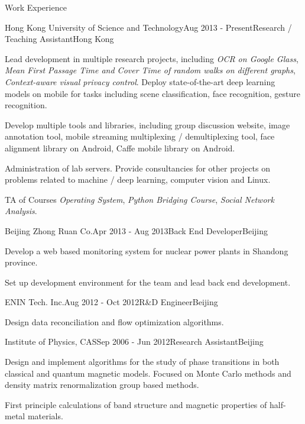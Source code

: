 \documentclass{resume} %
\begin{document}
\begin{rSection}{Work Experience}

\begin{rSubsection}{Hong Kong University of Science and Technology}{Aug 2013 - Present}{Research / Teaching Assistant}{Hong Kong}
\item Lead development in multiple research projects, including {\it OCR on Google Glass}, {\it Mean First Passage Time and Cover Time of random walks on different graphs}, {\it Context-aware visual privacy control}. Deploy state-of-the-art deep learning models on mobile for tasks including scene classification, face recognition, gesture recognition.

\item Develop multiple tools and libraries, including group discussion website, image annotation tool, mobile streaming multiplexing / demultiplexing tool, face alignment library on Android, Caffe mobile library on Android.

\item Administration of lab servers. Provide consultancies for other projects on problems related to machine / deep learning, computer vision and Linux.

\item TA of Courses {\it Operating System}, {\it Python Bridging Course}, {\it Social Network Analysis}.
\end{rSubsection}


\begin{rSubsection}{Beijing Zhong Ruan Co.}{Apr 2013 - Aug 2013}{Back End Developer}{Beijing}
\item Develop a web based monitoring system for nuclear power plants in Shandong province.
\item Set up development environment for the team and lead back end development.
\end{rSubsection}

\begin{rSubsection}{ENIN Tech. Inc.}{Aug 2012 - Oct 2012}{R\&D Engineer}{Beijing}
\item Design data reconciliation and flow optimization algorithms.
\end{rSubsection}

\begin{rSubsection}{Institute of Physics, CAS}{Sep 2006 - Jun 2012}{Research Assistant}{Beijing}
\item Design and implement algorithms for the study of phase transitions in both classical and quantum magnetic models. Focused on Monte Carlo methods and density matrix renormalization group based methods.
\item First principle calculations of band structure and magnetic properties of half-metal materials.
\end{rSubsection}

\end{rSection}
\end{document}
